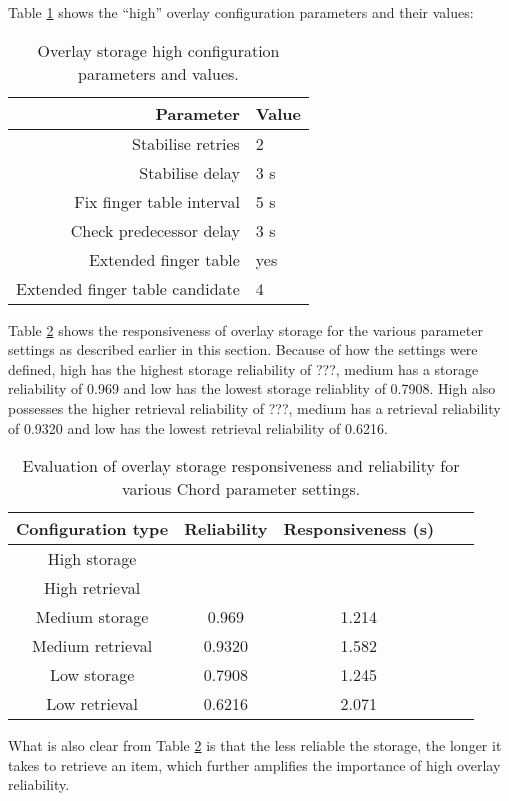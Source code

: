 Table \ref{tab_overlay_high} shows the ``high'' overlay configuration parameters and their values:
%
\begin{table}[htbp]
\centering
\begin{tabular}{|r|l|}
\hline
Parameter & Value\\
\hline
Stabilise retries               & 2\\
Stabilise delay                 & 3 s\\
Fix finger table interval       & 5 s\\
Check predecessor delay         & 3 s\\
Extended finger table           & yes\\
Extended finger table candidate & 4\\
\hline
\end{tabular}
\caption{Overlay storage high configuration parameters and values.}
\label{tab_overlay_high}
\end{table}

Table \ref{tab_overlay_rel_resp_results} shows the responsiveness of overlay storage for the various parameter settings as described earlier in this section. Because of how the settings were defined, high has the highest storage reliability of ???, medium has a storage reliability of 0.969 and low has the lowest storage reliablity of 0.7908. High also possesses the higher retrieval reliability of ???, medium has a retrieval reliability of 0.9320 and low has the lowest retrieval reliability of 0.6216.
%
\begin{table}[htbp]
\centering
\begin{tabular}{|c|c|c|c|c|}
\hline
Configuration type & Reliability & Responsiveness (s)\\
\hline
High storage     &           &          \\
High retrieval   &           &          \\
Medium storage   &   0.969   &   1.214  \\
Medium retrieval &   0.9320  &   1.582  \\
Low storage      &   0.7908  &   1.245  \\
Low retrieval    &   0.6216  &   2.071  \\
\hline
\end{tabular}
\caption{Evaluation of overlay storage responsiveness and reliability for various Chord parameter settings.}
\label{tab_overlay_rel_resp_results}
\end{table}

What is also clear from Table \ref{tab_overlay_rel_resp_results} is that the less reliable the storage, the longer it takes to retrieve an item, which further amplifies the importance of high overlay reliability.

